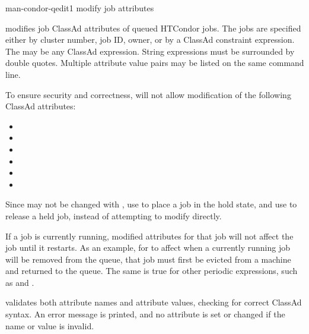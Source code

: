 \begin{ManPage}{}{man-condor-qedit}{1}
{modify job attributes}

\Synopsis {}
\ToolDebugOption
{}
\Arg{\Dots}

\Description

 modifies job ClassAd attributes of queued HTCondor jobs.
The jobs are specified either by cluster number, job ID,
owner, or by a ClassAd constraint expression.
The  may be any ClassAd expression.
String expressions must be surrounded by double quotes.
Multiple attribute value pairs may be listed on the same
command line.

To ensure security and correctness,
 will not allow modification of the following
ClassAd attributes:
\begin{itemize}
\item {}
\item {}
\item {}
\item {}
\item {}
\item {}
\end{itemize}

Since  may not be changed with ,
use  to place a job in the hold state,
and use  to release a held job,
instead of attempting to modify  directly.

If a job is currently running, modified attributes for that job will not 
affect the job until it restarts.
As an example, for
 to affect when a currently running job will be
removed from the queue, 
that job must first be evicted from a machine and returned to the queue.
The same is true for other periodic expressions, 
such as  and .

 validates both attribute names and attribute values,
checking for correct ClassAd syntax.
An error message is printed, 
and no attribute is set or changed if the name or value is invalid.

\begin{Options}
    \ToolDebugDesc
\end{Options}


\end{ManPage}
